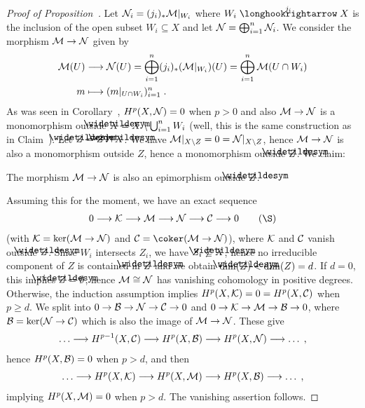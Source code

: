 \documentclass[a4paper,parskip=half,numbers=enddot, DIV=12]{scrreprt}
\renewcommand{\geq}{\geqslant}
\begin{document}
\begin{proof}[Proof of Proposition~]
Let $\mathcal{N}_i = (j_i)_\ast\mathcal{M}\vert_{W_i}$ where $W_i\monomorphism[j_i]X$ is the inclusion of the open subset $W_i\subseteq X$ and let $\mathcal{N}=\bigoplus_{i=1}^n\mathcal{N}_i$. We consider the morphism $\Mm\morphism\Nn$ given by
\begin{align*}
\Mm(U)&\morphism\Nn(U)=\bigoplus_{i=1}^n(j_{i})_*(\Mm|_{W_i})(U)=\bigoplus_{i=1}^n\Mm(U\cap W_i)\\
m&\longmapsto (m|_{U\cap W_i})_{i=1}^n\;.
\end{align*}
As was seen in Corollary~, $H^p(X,\mathcal{N})=0$ when $p>0$ and also $\Mm\morphism\Nn$ is a monomorphism outside $\snake{X}=X\setminus\bigcup_{i=1}^nW_i$ (well, this is the same construction as in Claim~). Let $\snake{Z}=Z\cap \snake{X}$. 
We have $\mathcal{M}|_{X\setminus Z}=0=\mathcal{N}|_{X\setminus Z}$, hence $\Mm\morphism \Nn$ is also a monomorphism outside $Z$, hence a monomorphism outside $\snake{Z}$. We claim:
\begin{claim}
	The morphism $\Mm\morphism\Nn$ is also an epimorphism outside $\snake{Z}$.
\end{claim}
Assuming this for the moment, we have an exact sequence
\begin{align}\lbl{eq:4termsequence}
	0\morphism\Kk\morphism\Mm\morphism\Nn\morphism\Cc\morphism 0\tag{\S}
\end{align}
(with $\Kk=\ker(\Mm\morphism\Nn)$ and $\Cc=\coker(\Mm\morphism\Nn)$), where $\mathcal{K}$ and $\mathcal{C}$ vanish outside $\snake{Z}$. Since $W_i$ intersects $Z_i$, we have $Z_i\not\subseteq \snake{X}$, hence no irreducible component of $Z$ is contained in $\snake{Z}$ and we obtain $\dim(\snake{Z})<\dim(Z)=d$. If $d=0$, this implies $\snake{Z}=\emptyset$, hence $\mathcal{M}\cong \mathcal{N}$ has vanishing cohomology in positive degrees. Otherwise, the induction assumption implies $H^p(X,\mathcal{K})=0=H^p(X,\mathcal{C})$ when $p\geq d$. We split  into $0\morphism\Bb\morphism\Nn\morphism\Cc\morphism 0$ and $0\morphism \Kk\morphism\Mm\morphism\Bb\morphism 0$, where $\Bb=\ker(\Nn\morphism\Cc)$ which is also the image of $\Mm\morphism\Nn$. These give
\begin{align*}
	\ldots\morphism H^{p-1}(X,\Cc)\morphism H^p(X,\Bb)\morphism H^p(X,\Nn)\morphism \ldots\;,
\end{align*}
hence $H^p(X,\mathcal{B})=0$ when $p>d$, and then
\begin{align*}
	\ldots\morphism H^p(X,\Kk)\morphism H^p(X,\Mm)\morphism H^p(X,\Bb)\morphism \ldots\;,
\end{align*}
implying $H^p(X,\mathcal{M})=0$ when $p>d$. The vanishing assertion follows.


\end{proof}
\end{document}
